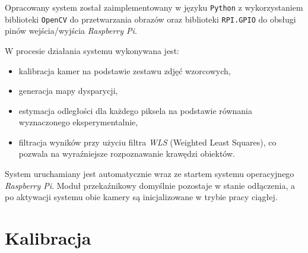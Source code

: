 \documentclass[magisterska]{pracadypl}
\begin{document}
Opracowany system został zaimplementowany w języku \texttt{Python} z wykorzystaniem biblioteki \texttt{OpenCV} do przetwarzania obrazów oraz biblioteki \texttt{RPI.GPIO} do obsługi pinów wejścia/wyjścia \textit{Raspberry Pi}.

W procesie działania systemu wykonywana jest:
\begin{itemize}
    \item kalibracja kamer na podstawie zestawu zdjęć wzorcowych,
    \item generacja mapy dysparycji,
    \item estymacja odległości dla każdego piksela na podstawie równania wyznaczonego eksperymentalnie,
    \item filtracja wyników przy użyciu filtra \textit{WLS} (Weighted Least Squares), co pozwala na wyraźniejsze rozpoznawanie krawędzi obiektów.
\end{itemize}

System uruchamiany jest automatycznie wraz ze startem systemu operacyjnego \textit{Raspberry Pi}. Moduł przekaźnikowy domyślnie pozostaje w stanie odłączenia, a po aktywacji systemu obie kamery są inicjalizowane w trybie pracy ciągłej.

\section{Kalibracja}
\end{document}
